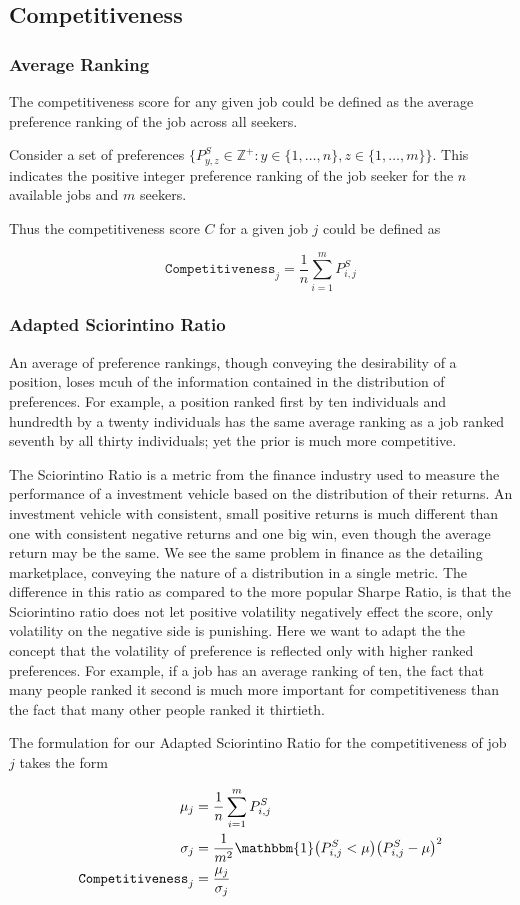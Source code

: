 \subsection{Competitiveness}

\subsubsection{Average Ranking}

The competitiveness score for any given job could be defined as the average preference ranking of the job across all seekers.

Consider a set of preferences $\{P^{S}_{y,z} \in \mathbb{Z}^+: y \in \{1, \dots, n\}, z \in \{1, \dots, m\}\}$. This indicates the positive integer preference ranking of the job seeker for the $n$ available jobs and $m$ seekers. 

Thus the competitiveness score $C$ for a given job $j$ could be defined as 

\[\texttt{Competitiveness}_j = \frac{1}{n} \sum_{i=1}^m P^S_{i,j}\]

\subsubsection{Adapted Sciorintino Ratio}

An average of preference rankings, though conveying the desirability of a position, loses mcuh of the information contained in the distribution of preferences. For example, a position ranked first by ten individuals and hundredth by a twenty individuals has the same average ranking as a job ranked seventh by all thirty individuals; yet the prior is much more competitive. 

The Sciorintino Ratio is a metric from the finance industry used to measure the performance of a investment vehicle based on the distribution of their returns. An investment vehicle with consistent, small positive returns is much different than one with consistent negative returns and one big win, even though the average return may be the same. We see the same problem in finance as the detailing marketplace, conveying the nature of a distribution in a single metric. The difference in this ratio as compared to the more popular Sharpe Ratio, is that the Sciorintino ratio does not let positive volatility negatively effect the score, only volatility on the negative side is punishing. Here we want to adapt the the concept that the volatility of preference is reflected only with higher ranked preferences. For example, if a job has an average ranking of ten, the fact that many people ranked it second is much more important for competitiveness than the fact that many other people ranked it thirtieth.

The formulation for our Adapted Sciorintino Ratio for the competitiveness of job $j$ takes the form

\begin{align}
\mu_j &= \frac{1}{n} \sum_{i=1}^m P^S_{i,j} \\
\sigma_j &= \frac{1}{m^2} \mathbbm{1}\big( P^S_{i,j} < \mu \big) \big(P^S_{i,j} - \mu \big)^2 \\
\texttt{Competitiveness}_j &= \frac{\mu_j}{\sigma_j}
\end{align}
